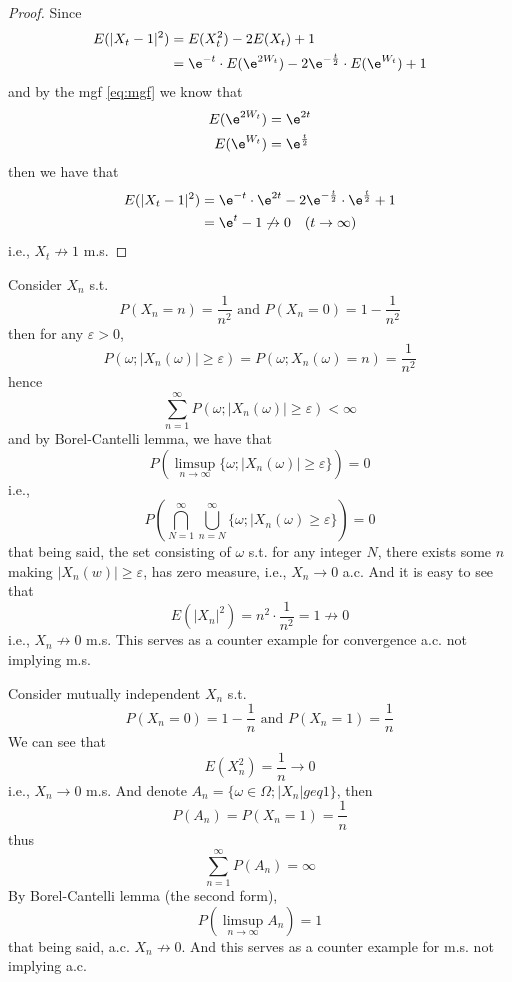 \begin{subproblem}
        \item
        \begin{proof}
            Since
            \[\begin{aligned}
                E(|X_t-1|^2)&=E(X_t^2)-2E(X_t)+1\\
                &=\e^{-t}\cdot E(\e^{2W_t})
                  -2\e^{-\frac t2}\cdot E(\e^{W_t})+1
            \end{aligned}\]
            and by the mgf \cref{eq:mgf} we know that
            \[\begin{aligned}
                E(\e^{2W_t})&=\e^{2t}\\
                E(\e^{W_t})&=\e^{\frac t2}\\
            \end{aligned}\]
            then we have that
            \[\begin{aligned}
                E(|X_t-1|^2)&=\e^{-t}\cdot\e^{2t}
                -2\e^{-\frac t2}\cdot\e^{\frac t2}+1\\
                &=\e^t-1\not\to 0\quad(t\to\infty)
            \end{aligned}\]
            i.e., $X_t\not\to 1$ m.s.
        \end{proof}

        \item
        Consider $X_n$ s.t.
        \[P(X_n=n)=\frac{1}{n^2}\text{ and }P(X_n=0)=1-\frac{1}{n^2}\]
        then for any $\varepsilon>0$,
        \[P(\omega;|X_n(\omega)|\geq\varepsilon)=P(\omega;X_n(\omega)=n)
        =\frac{1}{n^2}\]
        hence
        \[\sum_{n=1}^\infty P(\omega;|X_n(\omega)|\geq\varepsilon)<\infty\]
        and by Borel-Cantelli lemma, we have that
        \[P\left(\limsup_{n\to\infty}\{\omega;|X_n(\omega)|\geq\varepsilon\}\right)
        =0\]
        i.e.,
        \[P\left(\bigcap_{N=1}^\infty\bigcup_{n=N}^\infty
        \{\omega;|X_n(\omega)\geq\varepsilon\}\right)=0\]
        that being said, the set consisting of $\omega$ s.t.
        for any integer $N$,
        there exists some $n$ making $|X_n(w)|\geq\varepsilon$,
        has zero measure, i.e., $X_n\to 0$ a.c.
        And it is easy to see that
        \[E(|X_n|^2)=n^2\cdot\frac{1}{n^2}=1\not\to 0\]
        i.e., $X_n\not\to 0$ m.s. This serves as a counter example
        for convergence a.c. not implying m.s.

        Consider mutually independent $X_n$ s.t.
        \[P(X_n=0)=1-\frac{1}{n}\text{ and }
        P(X_n=1)=\frac{1}{n}\]
        We can see that
        \[E(X_n^2)=\frac{1}{n}\to 0\]
        i.e., $X_n\to 0$ m.s.
        And denote $A_n=\{\omega\in\Omega;|X_n|geq 1\}$,
        then
        \[P(A_n)=P(X_n=1)=\frac{1}{n}\]
        thus
        \[\sum_{n=1}^\infty P(A_n)=\infty\]
        By Borel-Cantelli lemma (the second form),
        \[P\left(\limsup_{n\to\infty}A_n\right)=1\]
        that being said,
        a.c. $X_n\not\to 0$. And this serves as a counter example
        for m.s. not implying a.c.


\end{subproblem}
